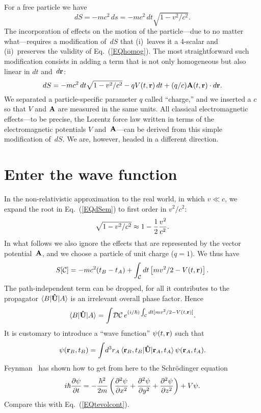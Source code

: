 \documentclass[12pt]{article}
\newcommand{\sandwich}[3]{\langle#1\vert#2\vert#3\rangle}
\newcommand{\DC}{\!{\cal DC}\,}
\newcommand{\be}{\begin{equation}}
\newcommand{\ee}{\end{equation}}
\renewcommand{\d}{\partial}
\newcommand{\bA}{{\bf A}}
\newcommand{\br}{{\bf r}}
\newcommand{\cC}{{\cal C}}
\newcommand{\hU}{{\bf\hat U}}
\begin{document}
For a free particle we have
\be
dS=-mc^2\,ds=-mc^2\,dt\sqrt{1-v^2/c^2}.
\ee
The incorporation of effects on the motion of the particle---due to no matter what---requires a modification of~$dS$ that (i)~leaves it a 4-scalar and (ii)~preserves the validity of Eq.~(\ref{EQhomog}). The most straightforward such modification consists in adding a term that is not only homogeneous but also linear in $dt$ and~$d\br$:
\be
dS=-mc^2\,dt\sqrt{1-v^2/c^2}-qV(t,\br)\,dt+(q/c)\bA(t,\br)\cdot d\br.
\label{EQdSem}
\ee
We separated a particle-specific parameter $q$ called ``charge,'' and we inserted a $c$ so that $V$ and $\bA$ are measured in the same units.
All classical electromagnetic effects---to be precise, the Lorentz force law written in terms of the electromagnetic potentials $V$ and~$\bA$---can be derived from this simple modification of~$dS$. We are, however, headed in a different direction.

\section{Enter the wave function}
In the non-relativistic approximation to the real world, in which $v\ll c$, we expand the root in Eq.~(\ref{EQdSem}) to first order in $v^2/c^2$:
\be
\sqrt{1-v^2/c^2}\approx 1-{1\over2}{v^2\over c^2}.
\ee
In what follows we also ignore the effects that are represented by the vector potential~$\bA$, and we choose a particle of unit charge ($q=1$). We thus have
\be
S[\cC]=-mc^2(t_B-t_A)+\int_\cC dt\left[mv^2/2-V(t,\br)\right].
\ee
The path-independent term can be dropped, for all it contributes to the propagator $\sandwich B\hU A$ is an irrelevant overall phase factor. Hence
\be
\sandwich B\hU A=\int\DC e^{(i/\hbar)\int_\cC dt[mv^2/2-V(t,\br)]}.
\label{EQnrprop}
\ee
 It is customary to introduce a ``wave function'' $\psi(t,\br)$ such that
\be
\psi(\br_B,t_B)=\int\!d^3r_A\,\sandwich{\br_B,t_B}\hU{\br_A,t_A}\,\psi(\br_A,t_A).
\label{EQwfprop}
\ee
Feynman~\cite{FH,Derbes} has shown how to get from here to the Schr\"odinger equation
\be
i\hbar{\d\psi\over\d t}=-{\hbar^2\over2m}\left({\d^2\psi\over\d x^2}+
{\d^2\psi\over\d y^2}+{\d^2\psi\over\d z^2}\right)+V\psi.
\label{EQschr}
\ee
Compare this with Eq.~(\ref{EQtevolcont}).

\end{document}
